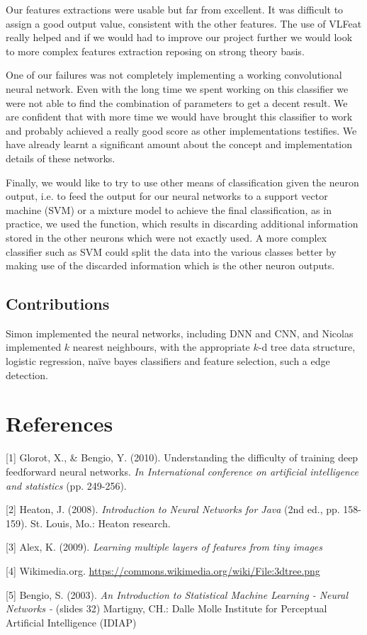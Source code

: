 \documentclass{article} %
\begin{document}
Our features extractions were usable but far from excellent. It was difficult to assign a good output value, consistent with the other features. The use of VLFeat really helped and if we would had to improve our project further we would look to more complex features extraction reposing on strong theory basis. 

One of our failures was not completely implementing a working convolutional neural network. Even with the long time we spent working on this classifier we were not able to find the combination of parameters to get a decent result. We are confident that with more time we would have brought this classifier to work and probably achieved a really good score as other implementations testifies. We have already learnt a significant amount about the concept and implementation details of these networks.

Finally, we would like to try to use other means of classification given the neuron output, i.e. to feed the output for our neural networks to a support vector machine (SVM) or a mixture model to achieve the final classification, as in practice, we used the  function, which results in discarding additional information stored in the other neurons which were not exactly used. A more complex classifier such as SVM could split the data into the various classes better by making use of the discarded information which is the other neuron outputs.


\subsection{Contributions}
Simon implemented the neural networks, including DNN and CNN, and Nicolas implemented $k$ nearest neighbours, with the appropriate $k$-d tree data structure, logistic regression, na\"ive bayes classifiers and feature selection, such a edge detection.



\section{References}
\small{
[1] Glorot, X., \& Bengio, Y. (2010). Understanding the difficulty of training deep feedforward neural networks. \textit{In International conference on artificial intelligence and statistics} (pp. 249-256).

[2] Heaton, J. (2008). \textit{Introduction to Neural Networks for Java} (2nd ed., pp. 158-159). St. Louis, Mo.: Heaton research.

[3] Alex, K. (2009). \textit{Learning multiple layers of features from tiny images}

[4] Wikimedia.org. \url{https://commons.wikimedia.org/wiki/File:3dtree.png}

[5] Bengio, S. (2003). \textit{An Introduction to Statistical Machine Learning - Neural Networks -} (slides 32) Martigny, CH.: Dalle Molle Institute for Perceptual Artificial Intelligence (IDIAP)
}
\end{document}
